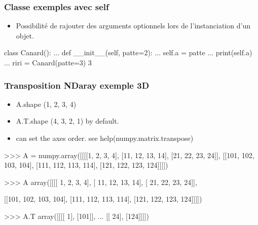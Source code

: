 \begin{frame}[fragile]
\frametitle{Classe exemples avec self}
\begin{itemize}
 \item Possibilité de rajouter des arguments optionnels lors de l'instanciation d'un objet. 
\end{itemize}
\begin{pythonConsole}
class Canard(): 
...     def __init__(self, patte=2):
...             self.a = patte
...             print(self.a)
... 
riri = Canard(patte=3)
3
\end{pythonConsole}
\end{frame}
\begin{frame}[fragile]
\frametitle{Transposition NDaray exemple 3D}
\begin{itemize}
 \item A.shape (1, 2, 3, 4)
 \item A.T.shape (4, 3, 2, 1) by default. 
 \item can set the axes order. see help(numpy.matrix.transpose)
\end{itemize}
\begin{pythonConsole}
>>> A = numpy.array([[[[1, 2, 3, 4], [11, 12, 13, 14], [21, 22, 23, 24]], [[101, 102, 103, 104], [111, 112, 113, 114], [121, 122, 123, 124]]]])

>>> A
array([[[[  1,   2,   3,   4],
         [ 11,  12,  13,  14],
         [ 21,  22,  23,  24]],

        [[101, 102, 103, 104],
         [111, 112, 113, 114],
         [121, 122, 123, 124]]]])

>>> A.T
array([[[[  1],
         [101]],
         ...
        [[ 24],
         [124]]]])
\end{pythonConsole}
\end{frame}
